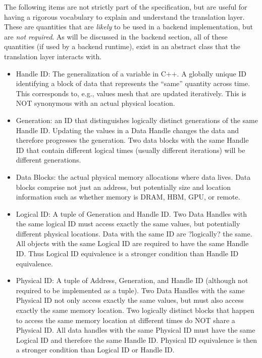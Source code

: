 The following items are not strictly part of the specification, but are useful for having a rigorous vocabulary to explain and understand the translation layer.
These are quantities that are \emph{likely} to be used in a backend implementation, but are \emph{not required}.
As will be discussed in the backend section, all of these quantities (if used by a backend runtime),
exist in an abstract class  that the translation layer interacts with.
\begin{itemize}
\item Handle ID: The generalization of a variable in C++. A globally unique ID identifying a block of data that represents the ``same'' quantity across time.  
This corresponds to, e.g., values mesh that are updated iteratively.  
This is NOT synonymous with an actual physical location.
\item Generation: an ID that distinguishes logically distinct generations of the same Handle ID. 
Updating the values in a Data Handle changes the data and therefore progresses the generation. 
Two data blocks with the same Handle ID that contain different logical times (usually different iterations) will be different generations.
\item Data Blocks: the actual physical memory allocations where data lives. 
Data blocks comprise not just an address, but potentially size and location information such as whether memory is DRAM, HBM, GPU, or remote.
\item Logical ID: A tuple of Generation and Handle ID. 
Two Data Handles with the same logical ID must access exactly the same values, but potentially different physical locations. 
Data with the same ID are ?logically? the same. 
All objects with the same Logical ID are required to have the same Handle ID.
Thus Logical ID equivalence is a stronger condition than Handle ID equivalence.
\item Physical ID: A tuple of Address, Generation, and Handle ID (although not required to be implemented as a tuple). 
Two Data Handles with the same Physical ID not only access exactly the same values, but must also access exactly the same memory location. 
Two logically distinct blocks that happen to access the same memory location at different times do NOT share a Physical ID. 
All data handles with the same Physical ID must have the same Logical ID and therefore the same Handle ID. 
Physical ID equivalence is then a stronger condition than Logical ID or Handle ID.
\end{itemize}

